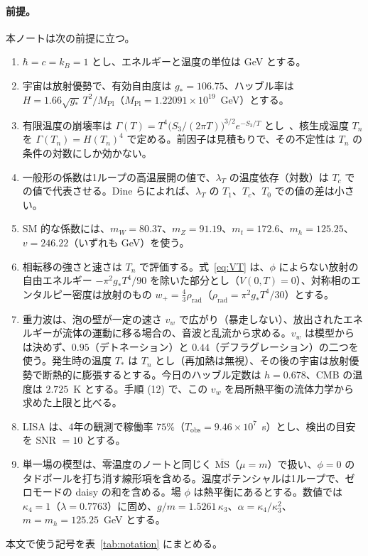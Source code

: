 \documentclass[a4paper,10pt]{ltjsarticle}
\begin{document}
\paragraph{前提。}本ノートは次の前提に立つ。
\begin{enumerate}
\item $\hbar=c=k_B=1$ とし、エネルギーと温度の単位は GeV とする。
\item 宇宙は放射優勢で、有効自由度は $g_*=106.75$、ハッブル率は $H=1.66\sqrt{g_*}\,T^2/M_{\mathrm{Pl}}$（$M_{\mathrm{Pl}}=1.22091\times10^{19}$~GeV）とする。
\item 有限温度の崩壊率は $\Gamma(T)=T^4\bigl(S_3/(2\pi T)\bigr)^{3/2}e^{-S_3/T}$ とし~\cite{linde83}、核生成温度 $T_n$ を $\Gamma(T_n)=H(T_n)^4$ で定める。前因子は見積もりで、その不定性は $T_n$ の条件の対数にしか効かない。
\item 一般形の係数は1ループの高温展開の値で、$\lambda_T$ の温度依存（対数）は $T_c$ での値で代表させる。Dine らによれば、$\lambda_T$ の $T_1$、$T_c$、$T_0$ での値の差は小さい。
\item SM 的な係数には、$m_W=80.37$、$m_Z=91.19$、$m_t=172.6$、$m_h=125.25$、$v=246.22$（いずれも GeV）を使う。
\item 相転移の強さと速さは $T_n$ で評価する。式~\eqref{eq:VT} は、$\phi$ によらない放射の自由エネルギー $-\pi^2g_*T^4/90$ を除いた部分とし（$V(0,T)=0$）、対称相のエンタルピー密度は放射のもの $w_+=\frac43\rho_{\mathrm{rad}}$（$\rho_{\mathrm{rad}}=\pi^2g_*T^4/30$）とする。
\item 重力波は、泡の壁が一定の速さ $v_w$ で広がり（暴走しない）、放出されたエネルギーが流体の運動に移る場合の、音波と乱流から求める。$v_w$ は模型からは決めず、$0.95$（デトネーション）と $0.44$（デフラグレーション）の二つを使う。発生時の温度 $T_*$ は $T_n$ とし（再加熱は無視）、その後の宇宙は放射優勢で断熱的に膨張するとする。今日のハッブル定数は $h=0.678$、CMB の温度は $2.725$~K とする。手順 (12) で、この $v_w$ を局所熱平衡の流体力学から求めた上限と比べる。
\item LISA は、4年の観測で稼働率 $75\%$（$T_{\mathrm{obs}}=9.46\times10^7$~s）とし、検出の目安を SNR $=10$ とする。
\item 単一場の模型は、零温度のノートと同じく $\overline{\mathrm{MS}}$（$\mu=m$）で扱い、$\phi=0$ のタドポールを打ち消す線形項を含める。温度ポテンシャルは1ループで、ゼロモードの daisy の和を含める。場 $\phi$ は熱平衡にあるとする。数値では $\kappa_4=1$（$\lambda=0.7763$）に固め、$g/m=1.5261\,\kappa_3$、$\alpha=\kappa_4/\kappa_3^2$、$m=m_h=125.25$~GeV とする。
\end{enumerate}
本文で使う記号を表~\ref{tab:notation} にまとめる。
\end{document}
